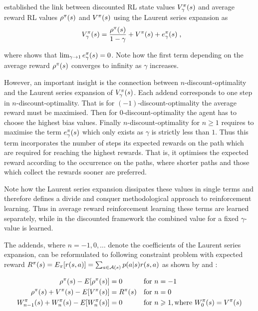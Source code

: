 \documentclass[envcountsame]{llncs}
\begin{document}
\cite{MillerVeinott1969} established the link between discounted RL state values
\(V_{\gamma}^{\pi}(s)\) and average reward RL values \(\rho^{\pi}(s)\) and \(V^{\pi}(s)\)
using the Laurent series expansion as
\begin{align*}
  V_{\gamma}^{\pol}(s) = \frac{\avgrew^{\pol}(s)}{1-\gamma} + V^{\pol}(s) + e_{\gamma}^{\pol}(s) \tcom
\end{align*}


where \cite{Puterman94} shows that \(\lim_{\gamma \to 1} e_{\gamma}^{\pi}(s) = 0\). Note how the
first term depending on the average reward \(\rho^{\pi}(s)\) converges to infinity as \(\gamma\)
increases.


However, an important insight is the connection between \(n\)-discount-optimality and the Laurent
series expansion of \(V_{\gamma}^{\pi}(s)\). Each addend corresponds to one step in
\(n\)-discount-optimality. That is for \((-1)\)-discount-optimality the average reward must be
maximised.
%
Then for \(0\)-discount-optimality the agent has to choose the highest bias values.
%
Finally \(n\)-discount-optimality for \(n \geqslant 1\) requires to maximise the term
\(e_{\gamma}^{\pi}(s)\) which only exists as \(\gamma\) is strictly less than \(1\). Thus this term
incorporates the number of steps its expected rewards on the path which are required for reaching
the highest rewards. That is, it optimises the expected reward according to the occurrence on the
paths, where shorter paths and those which collect the rewards sooner are preferred.

Note how the Laurent series expansion dissipates these values in single terms and therefore defines
a divide and conquer methodological approach to reinforcement learning. Thus in average reward
reinforcement learning these terms are learned separately, while in the discounted framework the
combined value for a fixed \(\gamma\)-value is learned.

The addends, where \(n=-1,0,\ldots\) denote the coefficients of the Laurent series expansion,
can be reformulated to following constraint problem with expected reward
\(R^{\pi}(s) = E_{\pi}[ r(s, a) ] = \sum_{a \in \mathcal{A}(s)}p(a | s) r(s, a)\) as shown by
\cite{MillerVeingsott1969} and \citet[p.346]{Puterman94}:

\begin{align}
  \label{eq:constr1}\rho^{\pi}(s) - E[\rho^{\pi}(s)] & = 0 &  & \text{for } n = -1 \\
  \label{eq:constr2}\rho^{\pi}(s) + V^{\pi}(s) - E[V^{\pi}(s)] & = R^{\pi}(s) && \text{for } n = 0 \\
  \label{eq:constr3}W^{\pi}_{n-1}(s) + W^{\pi}_{n}(s) - E[W^{\pi}_{n}(s)] & = 0 && \text{for } n \geqslant 1, \text{where } W_{0}^{\pi}(s) = V^{\pi}(s)
\end{align}
\end{document}
